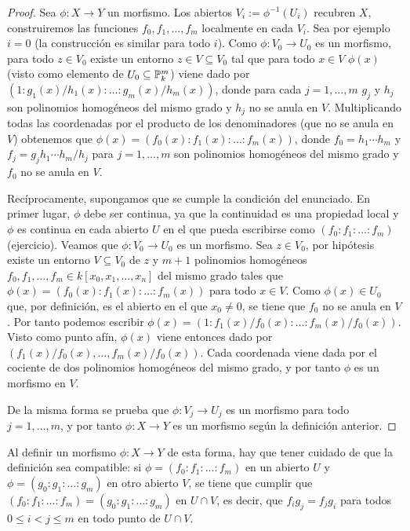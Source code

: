 \documentclass[ACGA.tex]{subfiles}
\begin{document}
\begin{proof}
 Sea $\phi:X\to Y$ un morfismo. Los abiertos $V_i:=\phi^{-1}(U_i)$ recubren $X$, construiremos las funciones $f_0,f_1,\ldots,f_m$ localmente en cada $V_i$. Sea por ejemplo $i=0$ (la construcción es similar para todo $i$). Como $\phi:V_0\to U_0$ es un morfismo, para todo $z\in V_0$ existe un entorno $z\in V\subseteq V_0$ tal que para todo $x\in V$ $\phi(x)$ (visto como elemento de $U_0\subseteq\mathbb{P}^m_k$) viene dado por $(1:g_1(x)/h_1(x):\ldots:g_m(x)/h_m(x))$, donde para cada $j=1,\ldots,m$ $g_j$ y $h_j$ son polinomios homogéneos del mismo grado y $h_j$ no se anula en $V$. Multiplicando todas las coordenadas por el producto de los denominadores (que no se anula en $V$) obtenemos que $\phi(x)=(f_0(x):f_1(x):\ldots:f_m(x))$, donde $f_0=h_1\cdots h_m$ y $f_j=g_jh_1\cdots h_m/h_j$ para $j=1,\ldots,m$ son polinomios homogéneos del mismo grado y $f_0$ no se anula en $V$.

Recíprocamente, supongamos que se cumple la condición del enunciado. En primer lugar, $\phi$ debe ser continua, ya que la continuidad es una propiedad local y $\phi$ es continua en cada abierto $U$ en el que pueda escribirse como $(f_0:f_1:\ldots:f_m)$ (ejercicio). Veamos que $\phi:V_0\to U_0$ es un morfismo. Sea $z\in V_0$, por hipótesis existe un entorno $V\subseteq V_0$ de $z$ y $m+1$ polinomios homogéneos $f_0,f_1,\ldots,f_m\in k[x_0,x_1,\ldots,x_n]$ del mismo grado tales que $\phi(x)=(f_0(x):f_1(x):\ldots:f_m(x))$ para todo $x\in V$. Como $\phi(x)\in U_0$ que, por definición, es el abierto en el que $x_0\neq 0$, se tiene que $f_0$ no se anula en $V$. Por tanto podemos escribir $\phi(x)=(1:f_1(x)/f_0(x):\ldots:f_m(x)/f_0(x))$. Visto como punto afín, $\phi(x)$ viene entonces dado por $(f_1(x)/f_0(x),\ldots,f_m(x)/f_0(x))$. Cada coordenada viene dada por el cociente de dos polinomios homogéneos del mismo grado, y por tanto $\phi$ es un morfismo en $V$.

De la misma forma se prueba que $\phi:V_j\to U_j$ es un morfismo para todo $j=1,\ldots,m$, y por tanto $\phi:X\to Y$ es un morfismo según la definición anterior.
\end{proof}

Al definir un morfismo $\phi:X\to Y$ de esta forma, hay que tener cuidado de que la definición sea compatible: si $\phi=(f_0:f_1:\ldots:f_m)$ en un abierto $U$ y $\phi=(g_0:g_1:\ldots:g_m)$ en otro abierto $V$, se tiene que cumplir que $(f_0:f_1:\ldots:f_m)=(g_0:g_1:\ldots:g_m)$ en $U\cap V$, es decir, que $f_ig_j=f_jg_i$ para todos $0\leq i<j\leq m$ en todo punto de $U\cap V$. 
\end{document}

